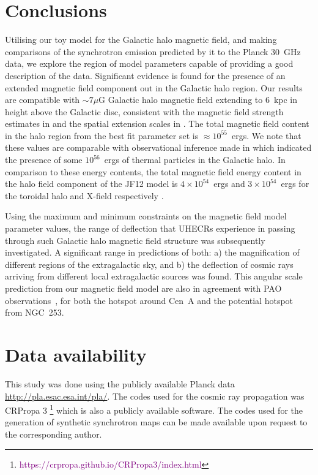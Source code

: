 \documentclass[usenatbib]{mnras}
\begin{document}
\section{Conclusions}
\label{Conclusions}

Utilising our toy model for the Galactic halo magnetic field, and making comparisons of the synchrotron emission predicted by it to the Planck 30~GHz data, we explore the region of model parameters capable of providing a good description of the data. Significant evidence is found for the presence of an extended magnetic field component out in the Galactic halo region. Our results are compatible with $\sim 7\mu$G Galactic halo magnetic field extending to 6~kpc in height above the Galactic disc, consistent with the magnetic field strength estimates in \cite{Carretti_2013} and the spatial extension scales in \cite{Su_2012}. The total magnetic field content in the halo region from the best fit parameter set is $\approx 10^{55}$~ergs. 
We note that these values are comparable with observational inference made in \cite{eROSITA} which indicated the presence of some $10^{56}$~ergs of thermal particles in the Galactic halo.
In comparison to these energy contents, the total magnetic field energy content in the halo field component of the JF12 model is $4\times 10^{54}$~ergs and $3\times  10^{54}$~ergs for the toroidal halo and X-field respectively \citep{Taylor_2019}.

Using the maximum and minimum constraints on the magnetic field model parameter values, the range of deflection that UHECRs experience in passing through such Galactic halo magnetic field structure was subsequently investigated. A significant range in predictions of both: a) the magnification of different regions of the extragalactic sky, and b) the deflection of cosmic rays arriving from different local extragalactic sources was found. This angular scale prediction from our magnetic field model are also in agreement with PAO observations~\citep{PierreAuger_2014, Auger_ICRC_2021}, for both the hotspot around Cen~A and the potential hotspot from NGC~253.

\section*{Data availability}
This study was done using the publicly available Planck data \hyperlink{Planck}{http://pla.esac.esa.int/pla/}. The codes used for the cosmic ray propagation was CRPropa 3 \citep{CRPropa3_2016}\footnote{\textcolor{purple}{https://crpropa.github.io/CRPropa3/index.html}} which is also a publicly available software. The codes used for the generation of synthetic synchrotron maps can be made available upon request to the corresponding author. 
\end{document}
